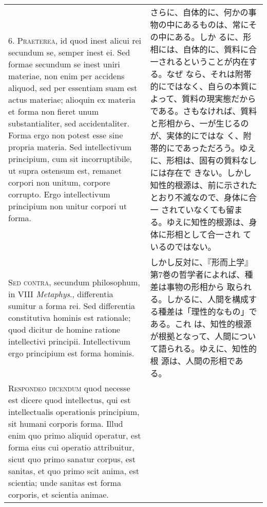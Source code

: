 \documentclass[paper=a4paper,fontsize=10pt,jafontsize=9pt,titlepage]{jlreq}
\begin{document}
\begin{longtable}{p{21em}p{21em}}
\\





6. {\scshape Praeterea}, id quod inest alicui rei secundum se, semper
inest ei. Sed formae secundum se inest uniri materiae, non enim per
accidens aliquod, sed per essentiam suam est actus materiae; alioquin
ex materia et forma non fieret unum substantialiter, sed
accidentaliter. Forma ergo non potest esse sine propria materia. Sed
intellectivum principium, cum sit incorruptibile, ut supra ostensum
est, remanet corpori non unitum, corpore corrupto. Ergo intellectivum
principium non unitur corpori ut forma.

 &

 さらに、自体的に、何かの事物の中にあるものは、常にその中にある。しか
 るに、形相には、自体的に、質料に合一されるということが内在する。なぜ
 なら、それは附帯的にではなく、自らの本質によって、質料の現実態だから
 である。さもなければ、質料と形相から、一が生じるのが、実体的にではな
 く、附帯的にであっただろう。ゆえに、形相は、固有の質料なしには存在で
 きない。しかし知性的根源は、前に示されたとおり不滅なので、身体に合一
 されていなくても留まる。ゆえに知性的根源は、身体に形相として合一され
 ているのではない。
 
\\





 {\scshape Sed contra}, secundum philosophum, in VIII {\itshape
 Metaphys}., differentia sumitur a forma rei. Sed differentia
 constitutiva hominis est rationale; quod dicitur de homine ratione
 intellectivi principii. Intellectivum ergo principium est forma
 hominis.
 
&

 しかし反対に、『形而上学』第7巻の哲学者によれば、種差は事物の形相から
 取られる。しかるに、人間を構成する種差は「理性的なもの」である。これ
 は、知性的根源が根拠となって、人間について語られる。ゆえに、知性的根
 源は、人間の形相である。
 
\\





 {\scshape Respondeo dicendum} quod necesse est dicere quod
 intellectus, qui est intellectualis operationis principium, sit
 humani corporis forma. Illud enim quo primo aliquid operatur, est
 forma eius cui operatio attribuitur, sicut quo primo sanatur corpus,
 est sanitas, et quo primo scit anima, est scientia; unde sanitas est
 forma corporis, et scientia animae.


\end{longtable}
\end{document}
